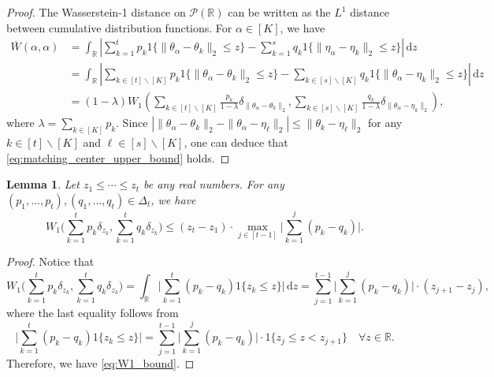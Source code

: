 \documentclass[11pt,letterpaper]{article}
\newtheorem{lemma}{Lemma} %
\theoremstyle{definition}
\numberwithin{equation}{section}
\newcommand{\R}{\mathbb{R}}
\begin{document}
\begin{proof}
    The Wasserstein-1 distance on $\mathscr{P}(\R)$ can be written as the $L^1$ distance between cumulative distribution functions. For $\alpha \in [K]$, we have
    \begin{equation*}
        \begin{split}
            \overline{W}(\alpha, \alpha) 
            & = \int_\R \left|\sum_{k = 1}^{t} p_k 1\{\|\theta_{\alpha} - \theta_k\|_2 \le z\} - \sum_{k = 1}^{s} q_k 1\{\|\eta_{\alpha} - \eta_k\|_2 \le z\}\right| \, \mathrm{d} z \\           
            & = \int_\R \left|\sum_{k \in [t] \backslash [K]} p_k 1\{\|\theta_{\alpha} - \theta_k\|_2 \le z\} - \sum_{k \in [s] \backslash [K]} q_k 1\{\|\theta_{\alpha} - \eta_k\|_2 \le z\}\right| \, \mathrm{d} z \\
            & = (1 - \lambda) W_1\left(\sum_{k \in [t] \backslash [K]} \tfrac{p_k}{1 - \lambda} \delta_{\|\theta_{\alpha} - \theta_k\|_2}, \sum_{k \in [s] \backslash [K]} \tfrac{q_k}{1 - \lambda} \delta_{\|\theta_{\alpha} - \eta_k\|_2}\right),
        \end{split}
    \end{equation*}
    where $\lambda = \sum_{k \in [K]} p_k$. Since $|\|\theta_\alpha - \theta_k\|_2 - \|\theta_\alpha - \eta_\ell\|_2| \le \|\theta_k - \eta_\ell\|_2$ for any $k \in [t] \backslash [K]$ and $\ell \in [s] \backslash [K]$, one can deduce that \eqref{eq:matching_center_upper_bound} holds.
\end{proof}


\begin{lemma}
    \label{lem:W1_bound}
    Let $z_1 \le \cdots \le z_t$ be any real numbers. For any $(p_1, \ldots, p_t), (q_1, \ldots, q_t) \in \Delta_t$, we have 
    \begin{equation}
        \label{eq:W1_bound}
        W_1\bigg(\sum_{k = 1}^{t} p_k \delta_{z_k}, \sum_{k = 1}^{t} q_k \delta_{z_k}\bigg) \le (z_t - z_1) \cdot \max_{j \in [t - 1]} \bigg|\sum_{k = 1}^{j} (p_k - q_k)\bigg|.
    \end{equation}
\end{lemma}
\begin{proof}
    Notice that
    \begin{equation*}
        W_1\bigg(\sum_{k = 1}^{t} p_k \delta_{z_k}, \sum_{k = 1}^{t} q_k \delta_{z_k}\bigg) = \int_{\R} \bigg|\sum_{k = 1}^{t} (p_k - q_k) 1\{z_k \le z\}\bigg| \, \mathrm{d} z = \sum_{j = 1}^{t - 1} \bigg|\sum_{k = 1}^{j} (p_k - q_k)\bigg| \cdot (z_{j + 1} - z_j),
    \end{equation*}
    where the last equality follows from 
    \begin{equation*}
        \bigg|\sum_{k = 1}^{t} (p_k - q_k) 1\{z_k \le z\}\bigg| = \sum_{j = 1}^{t - 1} \bigg|\sum_{k = 1}^{j} (p_k - q_k)\bigg| \cdot 1\{z_j \le z < z_{j + 1}\} \quad \forall z \in \R.
    \end{equation*}
    Therefore, we have \eqref{eq:W1_bound}.
\end{proof}
\end{document}
